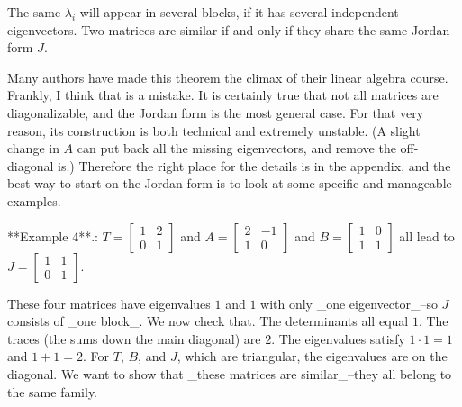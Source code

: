 The same \(\lambda_{i}\) will appear in several blocks, if it has several independent eigenvectors. Two matrices are similar if and only if they share the same Jordan form \(J\).

Many authors have made this theorem the climax of their linear algebra course. Frankly, I think that is a mistake. It is certainly true that not all matrices are diagonalizable, and the Jordan form is the most general case. For that very reason, its construction is both technical and extremely unstable. (A slight change in \(A\) can put back all the missing eigenvectors, and remove the off-diagonal is.) Therefore the right place for the details is in the appendix, and the best way to start on the Jordan form is to look at some specific and manageable examples.

**Example 4**.: \(T=\begin{bmatrix}1&2\\ 0&1\end{bmatrix}\) and \(A=\begin{bmatrix}2&-1\\ 1&0\end{bmatrix}\) and \(B=\begin{bmatrix}1&0\\ 1&1\end{bmatrix}\) all lead to \(J=\begin{bmatrix}1&1\\ 0&1\end{bmatrix}\).

These four matrices have eigenvalues \(1\) and \(1\) with only _one eigenvector_--so \(J\) consists of _one block_. We now check that. The determinants all equal \(1\). The traces (the sums down the main diagonal) are \(2\). The eigenvalues satisfy \(1\cdot 1=1\) and \(1+1=2\). For \(T\), \(B\), and \(J\), which are triangular, the eigenvalues are on the diagonal. We want to show that _these matrices are similar_--they all belong to the same family.

